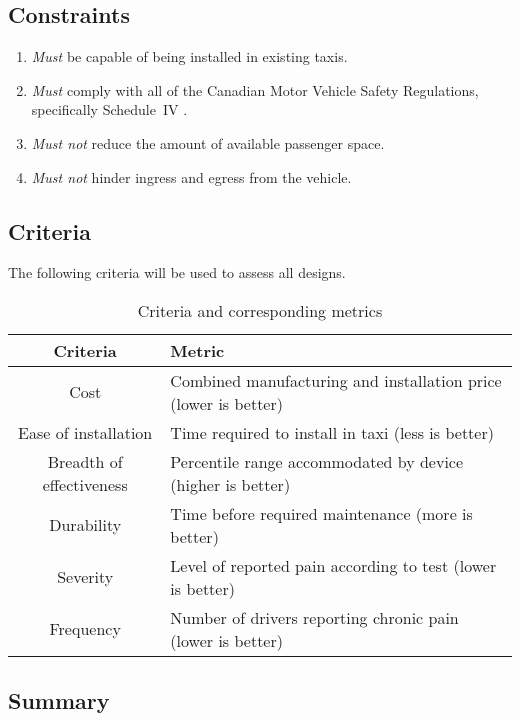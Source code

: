 \documentclass[11pt]{article}
\begin{document}
\subsection{Constraints}
\begin{enumerate}
\item \emph{Must} be capable of being installed in existing taxis.
\item \emph{Must} comply with all of the Canadian Motor Vehicle Safety Regulations,
specifically Schedule~IV \cite{motorregs}.
\item \emph{Must not} reduce the amount of available passenger space.
\item \emph{Must not} hinder ingress and egress from the vehicle.
\end{enumerate}
\subsection{Criteria}
The following criteria will be used to assess all designs.
\begin{table}[h]
\centering
\caption{Criteria and corresponding metrics}
\begin{tabular}{c p{10cm} }
  Criteria & Metric \\ \hline
  Cost & Combined manufacturing and installation price (lower is better) \\
  Ease of installation & Time required to install in taxi (less is better) \\
  Breadth of effectiveness & Percentile range accommodated by device (higher is better) \\
  Durability & Time before required maintenance (more is better) \\
  Severity & Level of reported pain according to test (lower is better) \\
  Frequency & Number of drivers reporting chronic pain (lower is better)
\end{tabular}
\end{table}

\subsection{Summary}
\end{document}
